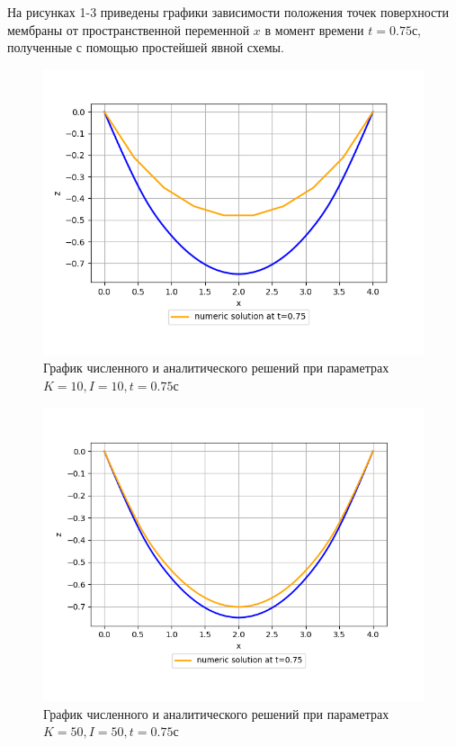 {{		 На рисунках 1-3 приведены графики зависимости положения точек поверхности мембраны от пространственной переменной $x$ в момент времени $t = 0.75с$, полученные с помощью простейшей явной схемы.
	
		 \begin{figure}[H]
		  \begin{center}
			\includegraphics[width=0.7\pagewidth]{plots/075_10_10}
	\caption{График численного и аналитического решений при параметрах $K=10, I=10, t = 0.75с$}
		 \end{center}
	\label{some_pic}
\end{figure}

 \begin{figure}[H]
   \begin{center}
			\includegraphics[width=0.7\pagewidth, height=0.4\pageheight]{plots/075_50_50}
	\caption{ График численного и аналитического решений при параметрах $K=50, I=50, t = 0.75с$}
	 \end{center}
	\label{some_pic}
\end{figure}

}}

